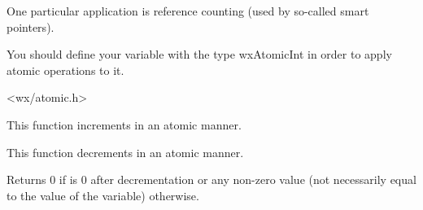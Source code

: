 One particular application is reference counting (used by so-called smart
pointers).

You should define your variable with the type wxAtomicInt in order to apply
atomic operations to it.


<wx/atomic.h>

\label{wxatomicinc}


This function increments  in an atomic manner.


\label{wxatomicdec}


This function decrements  in an atomic manner.

Returns 0 if  is 0 after decrementation or any non-zero value (not
necessarily equal to the value of the variable) otherwise.


